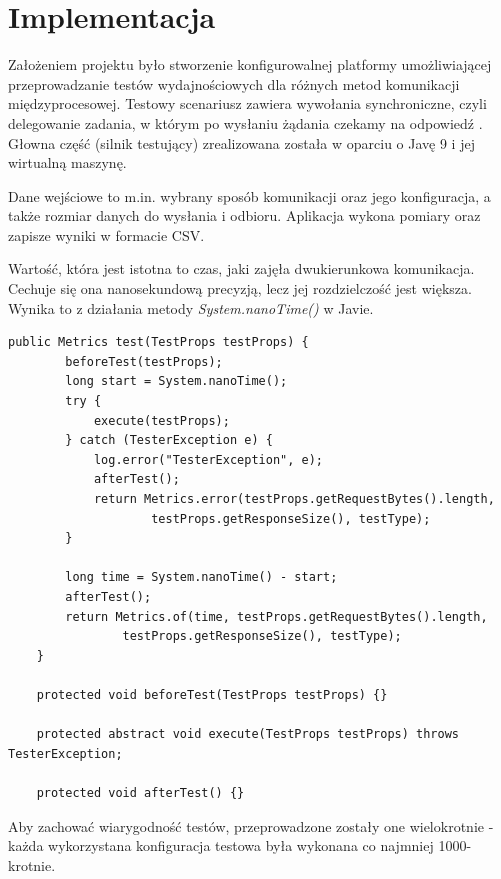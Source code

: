 \chapter{Implementacja}

Założeniem projektu było stworzenie konfigurowalnej platformy umożliwiającej przeprowadzanie testów wydajnościowych dla różnych metod komunikacji międzyprocesowej. Testowy scenariusz zawiera wywołania synchroniczne, czyli delegowanie zadania, w którym po wysłaniu żądania czekamy na odpowiedź . Głowna część (silnik testujący) zrealizowana została w oparciu o Javę 9 i jej wirtualną maszynę.

Dane wejściowe to m.in. wybrany sposób komunikacji oraz jego konfiguracja, a także rozmiar danych do wysłania i odbioru. Aplikacja wykona pomiary oraz zapisze wyniki w formacie CSV.

Wartość, która jest istotna to czas, jaki zajęła dwukierunkowa komunikacja. Cechuje się ona nanosekundową precyzją, lecz jej rozdzielczość jest większa. Wynika to z działania metody \textit{System.nanoTime()} w Javie.

\begin{lstlisting}[caption={Metoda klasy abstrakcyjnej AbstractTransferTester, która jest wykorzystywana przez wszystkie sposoby komunikacji do wykonania pomiarów (implementowane/przeciążane są ostatnie 3 metody).},captionpos=b]
    public Metrics test(TestProps testProps) {
        beforeTest(testProps);
        long start = System.nanoTime();
        try {
            execute(testProps);
        } catch (TesterException e) {
            log.error("TesterException", e);
            afterTest();
            return Metrics.error(testProps.getRequestBytes().length,
                    testProps.getResponseSize(), testType);
        }

        long time = System.nanoTime() - start;
        afterTest();
        return Metrics.of(time, testProps.getRequestBytes().length,
                testProps.getResponseSize(), testType);
    }

    protected void beforeTest(TestProps testProps) {}

    protected abstract void execute(TestProps testProps) throws TesterException;

    protected void afterTest() {}
\end{lstlisting}


Aby zachować wiarygodność testów, przeprowadzone zostały one wielokrotnie - każda wykorzystana konfiguracja testowa była wykonana co najmniej 1000-krotnie.

